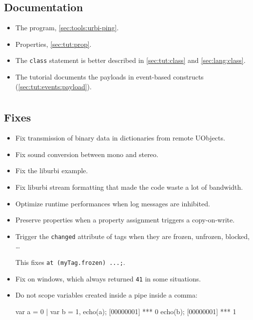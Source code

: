 \subsection{Documentation}
\begin{itemize}
\item The  program, \autoref{sec:tools:urbi-ping}.
\item Properties, \autoref{sec:tut:prop}.
\item The \lstinline|class| statement is better described in
  \autoref{sec:tut:class} and \autoref{sec:lang:class}.
\item The tutorial documents the payloads in event-based constructs
  (\autoref{sec:tut:events:payload}).
\end{itemize}


\section{}

\subsection{Fixes}

\begin{itemize}
\item Fix transmission of binary data in dictionaries from remote UObjects.
\item Fix sound conversion between mono and stereo.
\item Fix the  liburbi example.
\item Fix liburbi stream formatting that made the code waste a lot of
  bandwidth.
\item Optimize runtime performances when log messages are inhibited.
\item Preserve properties when a property assignment triggers a copy-on-write.
\item Trigger the \lstinline|changed| attribute of tags when they are
  frozen, unfrozen, blocked, \ldots

  This fixes \lstinline|at (myTag.frozen) ...;|.
\item Fix  on windows, which always returned
  \lstinline|41| in some situations.
\item Do not scope variables created inside a pipe inside a comma:
  \begin{urbiscript}
var a = 0 | var b = 1,
echo(a);
[00000001] *** 0
echo(b);
[00000001] *** 1
  \end{urbiscript}
\end{itemize}

